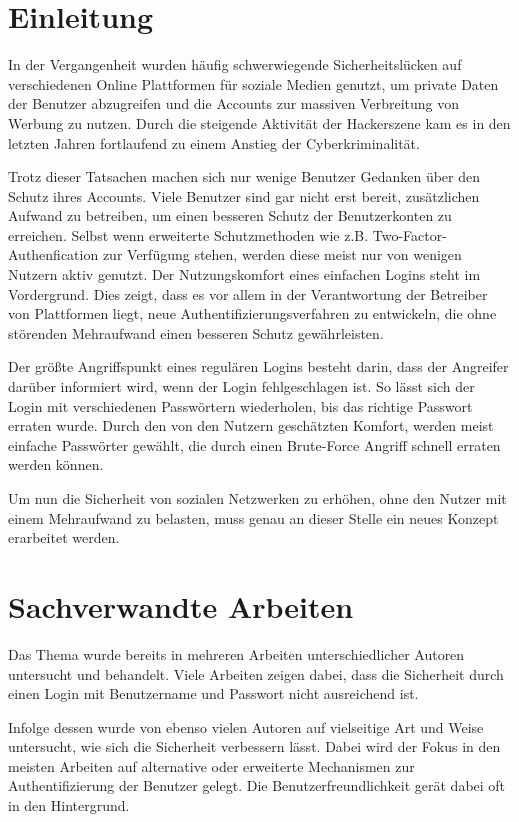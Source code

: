 \documentclass{sigchi}
\begin{document}

\section{Einleitung}
In der Vergangenheit wurden häufig schwerwiegende Sicherheitslücken auf verschiedenen Online Plattformen für soziale Medien genutzt, um private Daten der Benutzer abzugreifen und die Accounts zur massiven Verbreitung von Werbung zu nutzen. Durch die steigende Aktivität der Hackerszene kam es in den letzten Jahren fortlaufend zu einem Anstieg der Cyberkriminalität. \cite{bkaInternertkrimi}

Trotz dieser Tatsachen machen sich nur wenige Benutzer Gedanken über den Schutz ihres Accounts. \cite{benutzerGedanken} Viele Benutzer sind gar nicht erst bereit, zusätzlichen Aufwand zu betreiben, um einen besseren Schutz der Benutzerkonten zu erreichen. Selbst wenn erweiterte Schutzmethoden wie z.B. Two-Factor-Authenfication zur Verfügung stehen, werden diese meist nur von wenigen Nutzern aktiv genutzt. \cite{benutzungTwoFactor} Der Nutzungskomfort eines einfachen Logins steht im Vordergrund. Dies zeigt, dass es vor allem in der Verantwortung der Betreiber von Plattformen liegt, neue Authentifizierungsverfahren zu entwickeln, die ohne störenden Mehraufwand einen besseren Schutz gewährleisten.

Der größte Angriffspunkt eines regulären Logins besteht darin, dass der Angreifer darüber informiert wird, wenn der Login fehlgeschlagen ist. So lässt sich der Login mit verschiedenen Passwörtern wiederholen, bis das richtige Passwort erraten wurde. Durch den von den Nutzern geschätzten Komfort, werden meist einfache Passwörter gewählt, die durch einen Brute-Force Angriff schnell erraten werden können. \cite{benutzerGedanken}

Um nun die Sicherheit von sozialen Netzwerken zu erhöhen, ohne den Nutzer mit einem Mehraufwand zu belasten, muss genau an dieser Stelle ein neues Konzept erarbeitet werden.


\section{Sachverwandte Arbeiten}
Das Thema wurde bereits in mehreren Arbeiten unterschiedlicher Autoren untersucht und behandelt. Viele Arbeiten zeigen dabei, dass die Sicherheit durch einen Login mit Benutzername und Passwort nicht ausreichend ist. \cite{passwordsAreDead} \cite{taneski2014password}

Infolge dessen wurde von ebenso vielen Autoren auf vielseitige Art und Weise untersucht, wie sich die Sicherheit verbessern lässt. Dabei wird der Fokus in den meisten Arbeiten auf alternative oder erweiterte Mechanismen zur Authentifizierung der Benutzer gelegt. Die Benutzerfreundlichkeit gerät dabei oft in den Hintergrund. \cite{karapanos2015sound} \cite{amin2017security} \cite{jarecki2018two}
\end{document}
